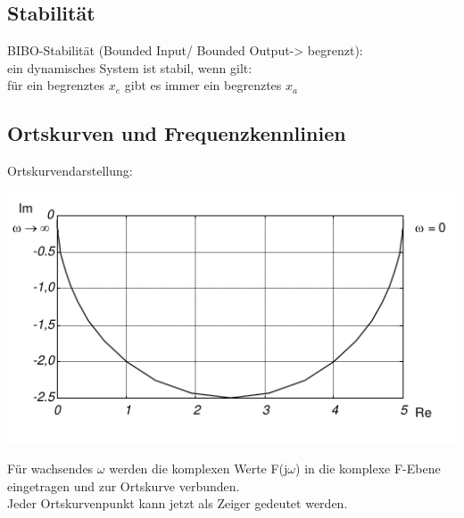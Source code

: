 \documentclass[10pt,a4paper]{article}
\begin{document}
\subsection{Stabilität}
\begin{mdframed}[style=exercise]
	BIBO-Stabilität (Bounded Input/ Bounded Output-> begrenzt):\\
	ein dynamisches System ist stabil, wenn gilt:\\
	für ein begrenztes $x_e$ gibt es immer ein begrenztes $x_a$
\end{mdframed}

\subsection{Ortskurven und Frequenzkennlinien}

Ortskurvendarstellung:
\begin{center}
	\includegraphics[width=0.96\columnwidth]{Figures/Ortskurve.png}
\end{center}
\begin{mdframed}[style=exercise]
	Für wachsendes $\omega$ werden die komplexen Werte F(j$\omega$) in die
	komplexe F-Ebene eingetragen und zur Ortskurve verbunden.\\ Jeder
	Ortskurvenpunkt kann jetzt als Zeiger gedeutet werden.
\end{mdframed}
\end{document}
